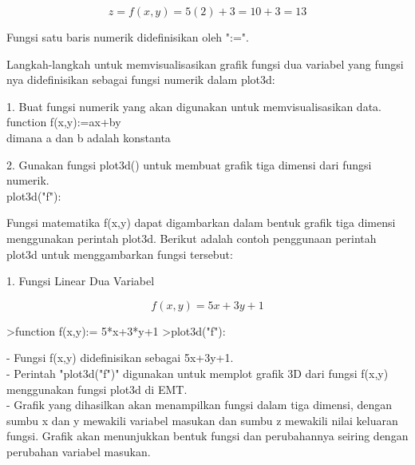 \documentclass[a4paper,10pt]{article}
\begin{document}
\begin{eulernotebook}
\begin{eulercomment}
\begin{eulercomment}
\begin{eulercomment}
\begin{eulercomment}
\begin{eulercomment}
\begin{eulercomment}
\begin{eulercomment}
\begin{eulercomment}
\begin{eulercomment}
\end{eulercomment}
\begin{eulerformula}
\[
z = f(x,y) = 5(2)+3 = 10+3 = 13
\]
\end{eulerformula}
\begin{eulercomment}
\end{eulercomment}
\begin{eulercomment}
Fungsi satu baris numerik didefinisikan oleh ":=".

Langkah-langkah untuk memvisualisasikan grafik fungsi dua variabel
yang fungsi nya didefinisikan sebagai fungsi numerik dalam plot3d:

1. Buat fungsi numerik yang akan digunakan untuk memvisualisasikan
data.\\
function f(x,y):=ax+by\\
dimana a dan b adalah konstanta

2. Gunakan fungsi plot3d() untuk membuat grafik tiga dimensi dari
fungsi numerik.\\
plot3d("f"):

\end{eulercomment}
\begin{eulercomment}
Fungsi matematika f(x,y) dapat digambarkan dalam bentuk grafik tiga
dimensi menggunakan perintah plot3d. Berikut adalah contoh penggunaan
perintah plot3d untuk menggambarkan fungsi tersebut:

1. Fungsi Linear Dua Variabel

\end{eulercomment}
\begin{eulerformula}
\[
f(x,y)=5x+3y+1
\]
\end{eulerformula}
\begin{eulerprompt}
>function f(x,y):= 5*x+3*y+1
>plot3d("f"):
\end{eulerprompt}
\begin{eulercomment}
- Fungsi f(x,y) didefinisikan sebagai 5x+3y+1.\\
- Perintah "plot3d("f")" digunakan untuk memplot grafik 3D dari fungsi
f(x,y) menggunakan fungsi plot3d di EMT.\\
- Grafik yang dihasilkan akan menampilkan fungsi dalam tiga dimensi,
dengan sumbu x dan y mewakili variabel masukan dan sumbu z mewakili
nilai keluaran fungsi. Grafik akan menunjukkan bentuk fungsi dan
perubahannya seiring dengan perubahan variabel masukan.


\end{eulercomment}
\end{eulercomment}
\end{eulercomment}
\end{eulercomment}
\end{eulercomment}
\end{eulercomment}
\end{eulercomment}
\end{eulercomment}
\end{eulercomment}
\end{eulernotebook}
\end{document}
